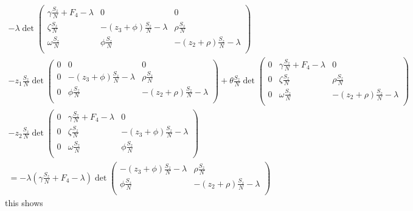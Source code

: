 \documentclass{mm2}
\numberwithin{equation}{section}
\theoremstyle{definition}
\begin{document}
\begin{eqnarray}
-\lambda \det
\begin{pmatrix}
\gamma\frac{S_z}{N} + F_4 - \lambda & 0 & 0 \\
\zeta\frac{S_z}{N} & - (z_3+ \phi)\frac{S_z}{N} - \lambda & \rho \frac{S_z}{N}\\
\omega\frac{S_z}{N} & \phi \frac{S_z}{N} & - (z_2 + \rho)\frac{S_z}{N} - \lambda\\
\end{pmatrix}
\nonumber \\- z_1 \frac{S_z}{N} \det
\begin{pmatrix}
0  & 0 & 0 \\
0  & - (z_3+ \phi)\frac{S_z}{N} - \lambda & \rho \frac{S_z}{N}\\
0  & \phi \frac{S_z}{N} & - (z_2 + \rho)\frac{S_z}{N} - \lambda\\
\end{pmatrix}
+ \theta \frac{S_z}{N} \det
\begin{pmatrix}
0 & \gamma\frac{S_z}{N} + F_4 - \lambda & 0 \\
0 & \zeta\frac{S_z}{N} & \rho \frac{S_z}{N}\\
0 &  \omega\frac{S_z}{N} & - (z_2 + \rho)\frac{S_z}{N} - \lambda\\
\end{pmatrix}
\nonumber \\ -z_2 \frac{S_z}{N} \det
\begin{pmatrix}
0 & \gamma\frac{S_z}{N} + F_4 - \lambda & 0  \\
0 & \zeta\frac{S_z}{N} & - (z_3+ \phi)\frac{S_z}{N} - \lambda\\
0 &  \omega\frac{S_z}{N} & \phi \frac{S_z}{N}\\
\end{pmatrix} \nonumber \\
= -\lambda (\gamma\frac{S_z}{N} + F_4 - \lambda) \det
\begin{pmatrix}
 - (z_3+ \phi)\frac{S_z}{N} -\lambda & \rho \frac{S_z}{N}\\
 \phi \frac{S_z}{N} & - (z_2 + \rho)\frac{S_z}{N} - \lambda\\
\end{pmatrix}
\end{eqnarray}
this shows 
\end{document}
